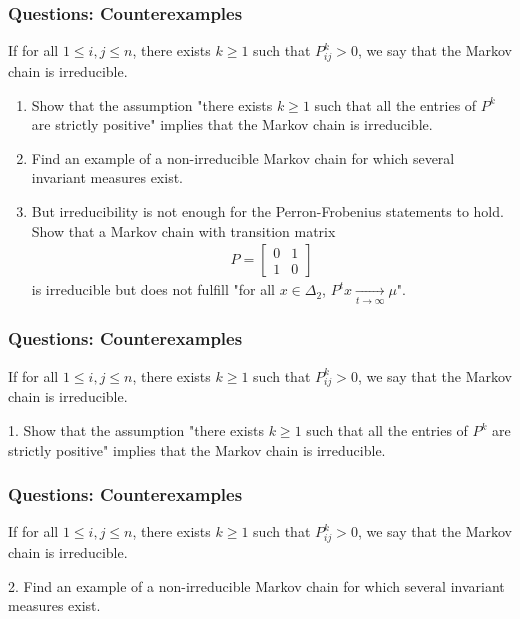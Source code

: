 \documentclass{beamer}
\begin{document}
\begin{frame}[t]
\frametitle{Questions: Counterexamples}
\vspace{-10pt}
\begin{definition}
If for all $1 \leq i,j \leq n$, there exists $k \geq 1$ such that $P^{k}_{ij} > 0$, we say that the Markov chain is irreducible.
\end{definition}
\begin{enumerate}
\item Show that the assumption "there exists $k \geq 1$ such that all the entries of $P^k$ are strictly positive" implies that the Markov chain is irreducible.
\item Find an example of a non-irreducible Markov chain for which several invariant measures exist.
\item But irreducibility is not enough for the Perron-Frobenius statements to hold. Show that a Markov chain with transition matrix
\begin{align*}
P = 
\begin{bmatrix}
0 & 1 \\
1 & 0
\end{bmatrix}
\end{align*}
is irreducible but does not fulfill "for all $x \in \Delta_2$,  $P^t x \xrightarrow[t \to \infty]{} \mu$".
\end{enumerate}
\end{frame}

\begin{frame}[t]
\frametitle{Questions: Counterexamples}
\vspace{-10pt}
\begin{definition}
If for all $1 \leq i,j \leq n$, there exists $k \geq 1$ such that $P^{k}_{ij} > 0$, we say that the Markov chain is irreducible.
\end{definition}
1. Show that the assumption "there exists $k \geq 1$ such that all the entries of $P^k$ are strictly positive" implies that the Markov chain is irreducible.
\end{frame}

\begin{frame}[t]
\frametitle{Questions: Counterexamples}
\vspace{-10pt}
\begin{definition}
If for all $1 \leq i,j \leq n$, there exists $k \geq 1$ such that $P^{k}_{ij} > 0$, we say that the Markov chain is irreducible.
\end{definition}
2. Find an example of a non-irreducible Markov chain for which several invariant measures exist.
\pause
\end{frame}
\end{document}
